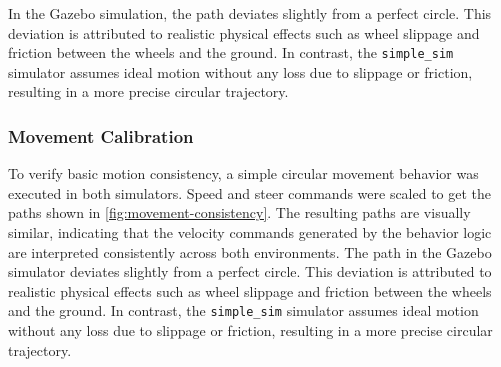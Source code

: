 In the Gazebo simulation, the path deviates slightly from a perfect circle. This deviation is attributed to realistic physical effects such as wheel slippage and friction between the wheels and the ground. In contrast, the \texttt{simple\_sim} simulator assumes ideal motion without any loss due to slippage or friction, resulting in a more precise circular trajectory.\\

\subsubsection{Movement Calibration}
To verify basic motion consistency, a simple circular movement behavior was executed in both simulators. Speed and steer commands were scaled to get the paths shown in \cref{fig:movement-consistency}. The resulting paths are visually similar, indicating that the velocity commands generated by the behavior logic are interpreted consistently across both environments. The path in the Gazebo simulator deviates slightly from a perfect circle. This deviation is attributed to realistic physical effects such as wheel slippage and friction between the wheels and the ground. In contrast, the \texttt{simple\_sim} simulator assumes ideal motion without any loss due to slippage or friction, resulting in a more precise circular trajectory.

